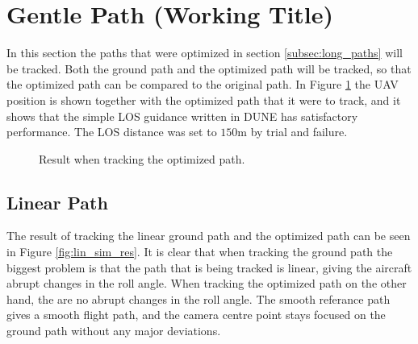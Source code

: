 \section{Gentle Path (Working Title)}

In this section the paths that were optimized in section \ref{subsec:long_paths} will be tracked. Both the ground path and the optimized path will be tracked, so that the optimized path can be compared to the original path. In Figure \ref{fig:sim_tracking} the UAV position is shown together with the optimized path that it were to track, and it shows that the simple LOS guidance written in DUNE has satisfactory performance. The LOS distance was set to $150$m by trial and failure.

\begin{figure}
	\caption{Result when tracking the optimized path.}
	\label{fig:sim_tracking}
\end{figure}


\subsection{Linear Path}

The result of tracking the linear ground path and the optimized path can be seen in Figure \ref{fig:lin_sim_res}. It is clear that when tracking the ground path the biggest problem is that the path that is being tracked is linear, giving the aircraft abrupt changes in the roll angle. When tracking the optimized path on the other hand, the are no abrupt changes in the roll angle. The smooth referance path gives a smooth flight path, and the camera centre point stays focused on the ground path without any major deviations.

